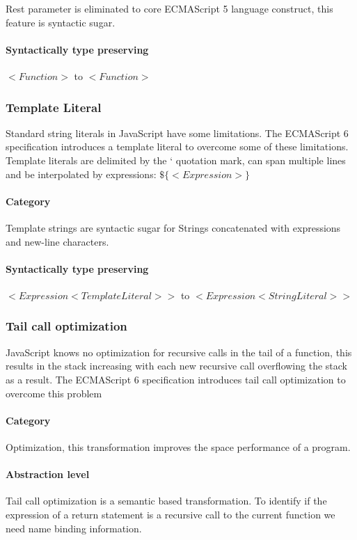 Rest parameter is eliminated to core ECMAScript 5 language construct, this feature is syntactic sugar.

\paragraph{Syntactically type preserving}
$<Function>$ to $<Function>$

\subsubsection{Template Literal}
Standard string literals in JavaScript have some limitations. The ECMAScript 6 specification introduces a template literal to overcome some of these limitations\cite[12.2.8]{SpecJS}. Template literals are delimited by the ` quotation mark, can span multiple lines and be interpolated by expressions: $\$\{<Expression>\}$

\paragraph{Category}
Template strings are syntactic sugar for Strings concatenated with expressions and new-line characters.

\paragraph{Syntactically type preserving}
$<Expression <TemplateLiteral>>$ to $<Expression <StringLiteral>>$

\subsubsection{Tail call optimization} \label{tail-call-optimization}
JavaScript knows no optimization for recursive calls in the tail of a function, this results in the stack increasing with each new recursive call overflowing the stack as a result.  The ECMAScript 6 specification introduces tail call optimization to overcome this problem\cite[14.6]{SpecJS}

\paragraph{Category}
Optimization, this transformation improves the space performance of a program.

\paragraph{Abstraction level}
Tail call optimization is a semantic based transformation. To identify if the expression of a return statement is a recursive call to the current function we need name binding information.

